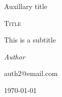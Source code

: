 {
	\thispagestyle{empty}
	\centering
	
	{\large Auxillary title}
	\vspace{2cm}
	
	{\scshape\LARGE{Title}}
	\vspace{0.5cm}
	
	{This is a subtitle\par} 
	\vspace{3cm}
	{\large\itshape Author\par}
	\vspace{0.5cm}
    	{\scriptsize auth2@email.com\par}
    	\vspace{5cm}
    	
	{\today\par}
	\vfill
}